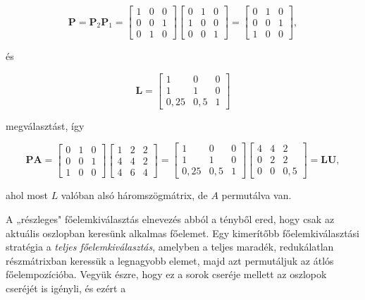\documentclass[
  magyar,
  11pt]{article}
\providecommand{\boldsymbol}[1]{\mathbf{#1}}
\begin{document}
\[\boldsymbol{P} = \boldsymbol{P}_2 \boldsymbol{P}_1 = \begin{bmatrix} 1 & 0 & 0 \\ 0 & 0 & 1 \\ 0 & 1 & 0 \end{bmatrix} \begin{bmatrix} 0 & 1 & 0 \\ 1 & 0 & 0 \\ 0 & 0 & 1 \end{bmatrix} = \begin{bmatrix} 0 & 1 & 0 \\ 0 & 0 & 1 \\ 1 & 0 & 0 \end{bmatrix},\]

és

\[\boldsymbol{L} = \begin{bmatrix} 1 & 0 & 0 \\ 1 & 1 & 0 \\ 0{,}25 & 0{,}5 & 1 \end{bmatrix}\]

megválasztást, így

\[\boldsymbol{P}\boldsymbol{A} = \begin{bmatrix} 0 & 1 & 0 \\ 0 & 0 & 1 \\ 1 & 0 & 0 \end{bmatrix} \begin{bmatrix} 1 & 2 & 2 \\ 4 & 4 & 2 \\ 4 & 6 & 4 \end{bmatrix} = \begin{bmatrix} 1 & 0 & 0 \\ 1 & 1 & 0 \\ 0{,}25 & 0{,}5 & 1 \end{bmatrix} \begin{bmatrix} 4 & 4 & 2 \\ 0 & 2 & 2 \\ 0 & 0 & 0{,}5 \end{bmatrix} = \boldsymbol{L}\boldsymbol{U},\]

ahol most \(L\) valóban alsó háromszögmátrix, de \(A\) permutálva van.

A „részleges" főelemkiválasztás elnevezés abból a tényből ered, hogy
csak az aktuális oszlopban keresünk alkalmas főelemet. Egy kimerítőbb
főelemkiválasztási stratégia a \emph{teljes főelemkiválasztás}, amelyben
a teljes maradék, redukálatlan részmátrixban keressük a legnagyobb
elemet, majd azt permutáljuk az átlós főelempozícióba. Vegyük észre,
hogy ez a sorok cseréje mellett az oszlopok cseréjét is igényli, és
ezért a
\end{document}
